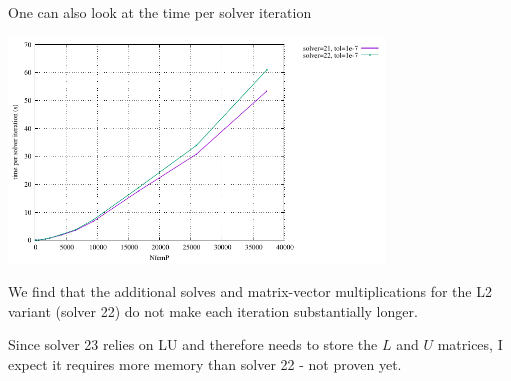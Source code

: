 One can also look at the time per solver iteration
\begin{center}
\includegraphics[width=10cm]{python_codes/fieldstone_147/RESULTS/L2/uzawa3/time_per_iteration.pdf}
\end{center}
We find that the additional solves and matrix-vector multiplications for the L2 variant (solver 22)
do not make each iteration substantially longer.

Since solver 23 relies on LU and therefore needs to store the $L$ and $U$
matrices, I expect it requires more memory than solver 22 - not proven yet.

